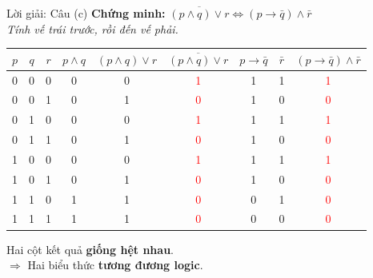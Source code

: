 \documentclass[aspectratio=169, 11pt]{beamer}
\begin{document}
\begin{frame}{Lời giải: Câu (c)}
\textbf{Chứng minh:} $\overline{(p \land q) \lor r} \Leftrightarrow (p \rightarrow \bar{q}) \land \bar{r}$\\
\textit{Tính vế trái trước, rồi đến vế phải.}

\vspace{0.15cm}
\begin{center}
\footnotesize
\setlength{\tabcolsep}{3.5pt}
\begin{tabular}{|c|c|c||c|c|c||c|c|c|}
\hline
$p$ & $q$ & $r$ & $p \land q$ & $(p \land q) \lor r$ & $\overline{(p \land q) \lor r}$ & $p \rightarrow \bar{q}$ & $\bar{r}$ & $(p \rightarrow \bar{q}) \land \bar{r}$ \\
\hline
0 & 0 & 0 & 0 & 0 & \textcolor{red}{1} & 1 & 1 & \textcolor{red}{1} \\
\hline
0 & 0 & 1 & 0 & 1 & \textcolor{red}{0} & 1 & 0 & \textcolor{red}{0} \\
\hline
0 & 1 & 0 & 0 & 0 & \textcolor{red}{1} & 1 & 1 & \textcolor{red}{1} \\
\hline
0 & 1 & 1 & 0 & 1 & \textcolor{red}{0} & 1 & 0 & \textcolor{red}{0} \\
\hline
1 & 0 & 0 & 0 & 0 & \textcolor{red}{1} & 1 & 1 & \textcolor{red}{1} \\
\hline
1 & 0 & 1 & 0 & 1 & \textcolor{red}{0} & 1 & 0 & \textcolor{red}{0} \\
\hline
1 & 1 & 0 & 1 & 1 & \textcolor{red}{0} & 0 & 1 & \textcolor{red}{0} \\
\hline
1 & 1 & 1 & 1 & 1 & \textcolor{red}{0} & 0 & 0 & \textcolor{red}{0} \\
\hline
\end{tabular}
\end{center}

\vspace{0.15cm}
Hai cột kết quả \textbf{giống hệt nhau}.\\
$\Rightarrow$ Hai biểu thức \textbf{tương đương logic}.
\end{frame}
\end{document}
